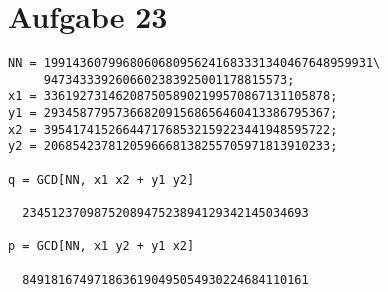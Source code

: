 \section*{Aufgabe 23}
\begin{lstlisting}
NN = 1991436079968060680956241683331340467648959931\
     9473433392606602383925001178815573;
x1 = 3361927314620875058902199570867131105878;
y1 = 2934587795736682091568656460413386795367;
x2 = 3954174152664471768532159223441948595722;
y2 = 2068542378120596668138255705971813910233;

q = GCD[NN, x1 x2 + y1 y2]

  2345123709875208947523894129342145034693

p = GCD[NN, x1 y2 + y1 x2]

  8491816749718636190495054930224684110161
\end{lstlisting}

